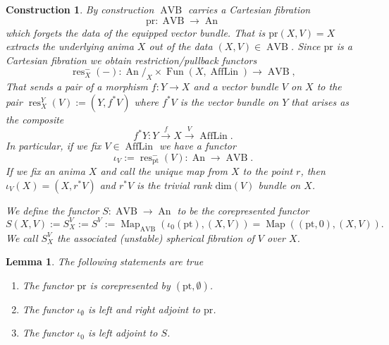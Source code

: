 \documentclass{article}
\newcommand{\pt}{\mathrm{pt}}
\newcommand{\pr}{\mathrm{pr}}
\DeclareMathOperator{\AVB}{AVB}
\DeclareMathOperator{\An}{An}
\DeclareMathOperator{\Fun}{Fun}
\DeclareMathOperator{\AffLin}{AffLin}
\DeclareMathOperator{\res}{res}
\DeclareMathOperator{\Map}{Map}
\newtheorem{lemma}{Lemma}
\newtheorem{construction}{Construction}
\begin{document}
\begin{construction}\label{construction: mainfunctors}
    By construction $\AVB$ carries a Cartesian fibration
     \[
        \pr \colon \AVB \to \An
     \]
    which forgets the data of the equipped vector bundle. That is 
    $\pr(X,V) = X$ extracts the underlying anima $X$ out of the data $(X,V) \in \AVB$.
    Since $\pr$ is a Cartesian fibration we obtain restriction/pullback functors 
    \[
     \res_X^-(-) \colon \An/_X \times \Fun(X,\AffLin) \to \AVB,   
    \]  
    That sends a pair of a morphism $f \colon Y \to X$ and a vector bundle $V$ on $X$ 
    to the pair $\res^Y_X(V) := (Y, f^*V)$ where $f^*V$ is the vector bundle on $Y$ that 
    arises as the composite 
    \[ 
        f^*Y \colon Y \xrightarrow{f} X \xrightarrow{V} \AffLin.
    \]
    In particular, if we fix $V \in \AffLin$ we have a functor
    \[ 
        \iota_V := \res_\pt^-(V) \colon \An \to \AVB.     
    \]
    If we fix an anima $X$ and call the unique map from $X$ to the point $r$, then 
    $ \iota_V(X) = (X,r^*V)$ and $r^*V$ is the trivial 
    rank $\mathrm{dim}(V)$ bundle on $X$.

    We define the functor $S \colon \AVB \to \An$ to be the corepresented functor 
    \[ 
    S(X,V) := S^V_X := S^V := \Map_{\AVB}(\iota_0(\pt),(X,V)) = \Map((\pt, 0),(X,V)).    
    \]
    We call $S^V_X$ the \emph{associated (unstable) spherical fibration of $V$ over $X$}.

\end{construction}

\begin{lemma}The following statements are true
    \begin{enumerate}
        \item The functor $\pr$ is corepresented by $(\pt, \emptyset)$.
        \item The functor $\iota_\emptyset$ is left and right adjoint to $\pr$.
        \item The functor $\iota_0$ is left adjoint to $S$.
    \end{enumerate}
    \label{lemma:insight}
\end{lemma}
\end{document}
